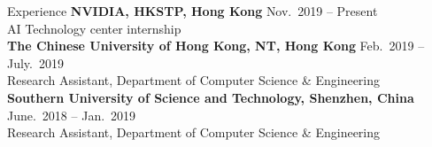 
\begin{rSection}{Experience}
{\bf NVIDIA, HKSTP, Hong Kong}               \hfill { Nov.~2019 -- Present} \\
AI Technology center internship \\

{\bf The Chinese University of Hong Kong, NT, Hong Kong}               \hfill { Feb.~2019 -- July.~2019} \\
Research Assistant, Department of Computer Science \& Engineering \\

{\bf Southern University of Science and Technology, Shenzhen, China}  \hfill { June.~2018 -- Jan.~2019} \\ 
Research Assistant, Department of Computer Science \& Engineering \\




\end{rSection}


